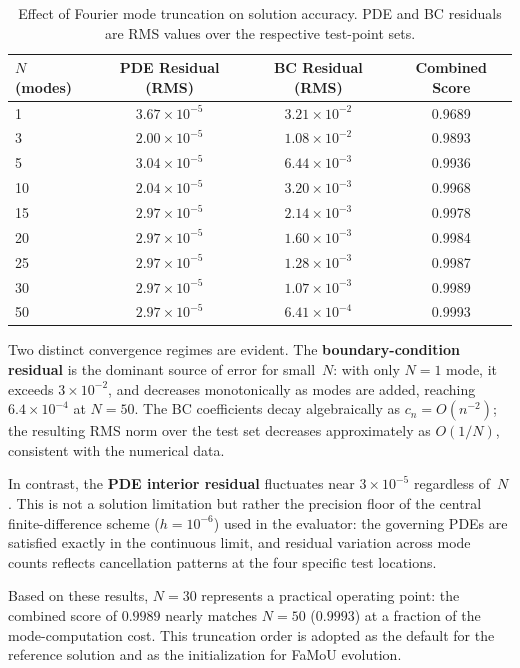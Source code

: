\begin{table}[h]
  \centering
  \caption{Effect of Fourier mode truncation on solution accuracy. PDE and BC residuals are RMS values over the respective test-point sets.}
  \label{tab:ablation}
  \begin{tabular}{@{}lccc@{}}
    \toprule
    $N$ (modes) & PDE Residual (RMS) & BC Residual (RMS) & Combined Score \\
    \midrule
    1   & $3.67 \times 10^{-5}$ & $3.21 \times 10^{-2}$ & 0.9689 \\
    3   & $2.00 \times 10^{-5}$ & $1.08 \times 10^{-2}$ & 0.9893 \\
    5   & $3.04 \times 10^{-5}$ & $6.44 \times 10^{-3}$ & 0.9936 \\
    10  & $2.04 \times 10^{-5}$ & $3.20 \times 10^{-3}$ & 0.9968 \\
    15  & $2.97 \times 10^{-5}$ & $2.14 \times 10^{-3}$ & 0.9978 \\
    20  & $2.97 \times 10^{-5}$ & $1.60 \times 10^{-3}$ & 0.9984 \\
    25  & $2.97 \times 10^{-5}$ & $1.28 \times 10^{-3}$ & 0.9987 \\
    30  & $2.97 \times 10^{-5}$ & $1.07 \times 10^{-3}$ & 0.9989 \\
    50  & $2.97 \times 10^{-5}$ & $6.41 \times 10^{-4}$ & 0.9993 \\
    \bottomrule
  \end{tabular}
\end{table}

Two distinct convergence regimes are evident. The \textbf{boundary-condition residual} is the dominant source of error for small~$N$: with only $N{=}1$ mode, it exceeds $3 \times 10^{-2}$, and decreases monotonically as modes are added, reaching $6.4 \times 10^{-4}$ at $N{=}50$. The BC coefficients decay algebraically as $c_n = O(n^{-2})$; the resulting RMS norm over the test set decreases approximately as $O(1/N)$, consistent with the numerical data.

In contrast, the \textbf{PDE interior residual} fluctuates near $3 \times 10^{-5}$ regardless of~$N$. This is not a solution limitation but rather the precision floor of the central finite-difference scheme ($h = 10^{-6}$) used in the evaluator: the governing PDEs are satisfied exactly in the continuous limit, and residual variation across mode counts reflects cancellation patterns at the four specific test locations.

Based on these results, $N{=}30$ represents a practical operating point: the combined score of $0.9989$ nearly matches $N{=}50$ ($0.9993$) at a fraction of the mode-computation cost. This truncation order is adopted as the default for the reference solution and as the initialization for FaMoU evolution.


